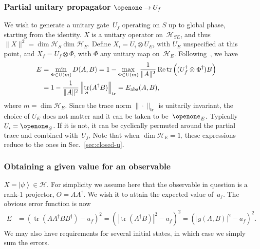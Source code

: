 \documentclass[aps, pra, a4paper, longbibliography, superscriptaddress]{revtex4-1}
\newcommand{\I}{\openone}
\newcommand{\ket}[1]{\left| #1 \right \rangle}
\newcommand{\hilb}[1]{\mathcal{#1}}
\DeclareMathOperator{\tr}{tr}
\DeclareMathOperator{\re}{Re}
\begin{document}
\subsubsection{Partial unitary propagator $\I \to U_f$}
\label{sec:partU}

We wish to generate a unitary gate~$U_f$ operating on $S$ up to global
phase, starting from the identity.
$X$ is a unitary operator on~$\hilb{H}_{SE}$, and
thus $\|X\|^2 = \dim \hilb{H}_S \dim \hilb{H}_E$.
Define $X_i = U_i \otimes U_E$, with $U_E$ unspecified at this point,
and $X_f = U_f \otimes \Phi$, with $\Phi$ any unitary map on~$\hilb{H}_E$.
Following~\cite{kosut_2006,floether_2012}, we have
\begin{align}
\notag
E
&= \min_{\Phi \in \text{U}(m)} D(A, B)
= 1 -\max_{\Phi \in \text{U}(m)} \frac{1}{\|A\|^2} \re \tr\left((U_f^\dagger \otimes \Phi^\dagger) B\right)\\
&= 1 -\frac{1}{\|A\|^2} \left\|\tr_S(A^\dagger B)\right\|_{\tr}
= E_\text{abs}(A, B),
\end{align}
where $m = \dim \hilb{H}_E$.
Since the trace norm $\|\cdot\|_{\tr}$ is unitarily invariant, the
choice of $U_E$ does not matter and it can be taken to be~$\I_E$.
Typically $U_i = \I_S$. If it is not, it can be cyclically permuted around the partial trace and combined with~$U_f$,
Note that when $\dim \hilb{H}_E = 1$, these expressions reduce to the ones in Sec.~\ref{sec:closed-u}.


\subsubsection{Obtaining a given value for an observable}

$X = \ket{\psi} \in \hilb{H}$.
For simplicity we assume here that the observable in question is a rank-1 projector,
$O = A A^\dagger$. We wish it to attain the expected value of~$a_{f}$. The obvious error function is now
\begin{align}
E
&=
\left(\tr\left(A A^\dagger B B^\dagger \right) -a_{f} \right)^2
= \left(\left|\tr(A^\dagger B)\right|^2 -a_{f} \right)^2
= \left(\left|g(A, B)\right|^2 -a_{f} \right)^2.
\end{align}
We may also have requirements for several initial states, in which case we simply sum the errors.
\end{document}

